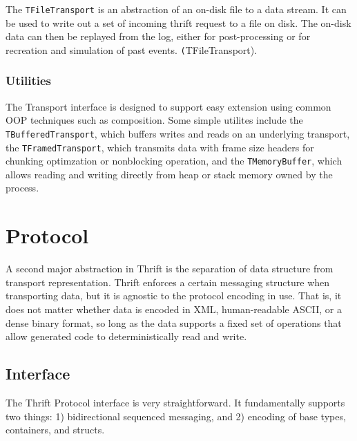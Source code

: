 \documentclass[nocopyrightspace,blockstyle]{sigplanconf}
\begin{document}
The \texttt{TFileTransport} is an abstraction of an on-disk file to a data
stream. It can be used to write out a set of incoming thrift request to a file
on disk. The on-disk data can then be replayed from the log, either for post-processing
or for recreation and simulation of past events. \texttt(TFileTransport).

\subsubsection{Utilities}

The Transport interface is designed to support easy extension using common
OOP techniques such as composition. Some simple utilites include the
\texttt{TBufferedTransport}, which buffers writes and reads on an underlying
transport, the \texttt{TFramedTransport}, which transmits data with frame
size headers for chunking optimzation or nonblocking operation, and the
\texttt{TMemoryBuffer}, which allows reading and writing directly from heap or
stack memory owned by the process.

\section{Protocol}

A second major abstraction in Thrift is the separation of data structure from
transport representation. Thrift enforces a certain messaging structure when
transporting data, but it is agnostic to the protocol encoding in use. That is,
it does not matter whether data is encoded in XML, human-readable ASCII, or a
dense binary format, so long as the data supports a fixed set of operations
that allow generated code to deterministically read and write.

\subsection{Interface}

The Thrift Protocol interface is very straightforward. It fundamentally
supports two things: 1) bidirectional sequenced messaging, and
2) encoding of base types, containers, and structs.
\end{document}
